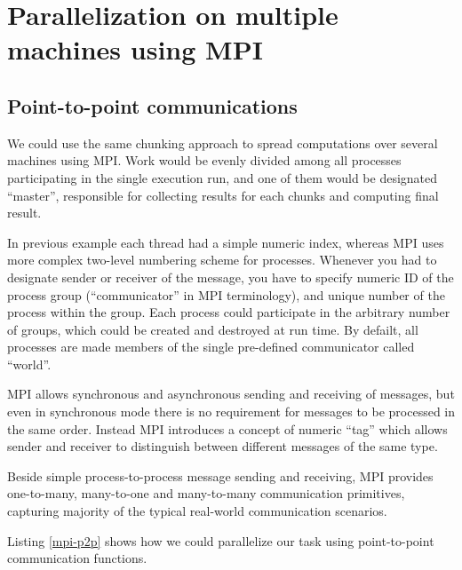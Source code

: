 \documentclass{tmr}
\begin{document}
\section{Parallelization on multiple machines using MPI}

\subsection{Point-to-point communications}

We could use the same chunking approach to spread computations over
several machines using MPI. Work would be evenly divided among all
processes participating in the single execution run, and one of them
would be designated ``master'', responsible for collecting results for
each chunks and computing final result. 

In previous example each thread had a simple numeric index, whereas
MPI uses more complex two-level numbering scheme for processes.
Whenever you had to designate sender or receiver of the message, you
have to specify numeric ID of the process group (``communicator'' in
MPI terminology), and unique number of the process within the group.
Each process could participate in the arbitrary number of groups,
which could be created and destroyed at run time. By defailt, all
processes are made members of the single pre-defined communicator
called ``world''.

MPI allows synchronous and asynchronous sending and receiving of
messages, but even in synchronous mode there is no requirement for
messages to be processed in the same order. Instead MPI introduces a
concept of numeric ``tag'' which allows sender and receiver to
distinguish between different messages of the same type.

Beside simple process-to-process message sending and receiving, MPI
provides one-to-many, many-to-one and many-to-many communication
primitives, capturing majority of the typical real-world communication
scenarios.

Listing \ref{mpi-p2p} shows how we could parallelize our task using
point-to-point communication functions.
\end{document}
